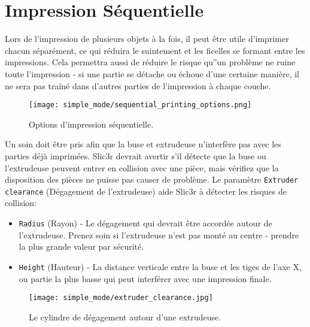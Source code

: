
\section{Impression S\'equentielle} %
\label{sec:sequential_printing}

Lors de l'impression de plusieurs objets \`a la fois, il peut \^etre utile d'imprimer chacun s\'epar\'ement, ce qui r\'eduira le suintement et les ficelles se formant entre les impressions. Cela permettra aussi de r\'eduire le risque qu''un probl\`eme ne ruine toute l'impression - si une partie se d\'etache ou \'echoue d'une certaine mani\`ere, il ne sera pas tra\^in\'e dans d'autres parties de l'impression \`a chaque couche.

\begin{figure}[H]
\centering
\texttt{[image: simple\_mode/sequential\_printing\_options.png]}
\caption{Options d'impression s\'equentielle.}
\label{fig:sequential_printing_options}
\end{figure}

Un soin doit \^etre pris afin que la buse et extrudeuse n'interf\`ere pas avec les parties d\'ej\`a imprim\'ees.  Slic3r devrait avertir s'il d\'etecte que la buse ou l'extrudeuse peuvent entrer en collision avec une pi\`ece, mais v\'erifiez que la disposition des pi\`eces ne puisse pas causer de probl\`eme.  Le param\`etre \texttt{Extruder clearance} (D\'egagement de l'extrudeuse) aide Slic3r \`a d\'etecter les risques de collision:
\begin{itemize}
	\item \texttt{Radius} (Rayon) - Le d\'egagement qui devrait \^etre accord\'ee autour de l'extrudeuse. Prenez soin si l'extrudeuse n'est pas mont\'e au centre - prendre la plus grande valeur par s\'ecurit\'e.
	\item \texttt{Height} (Hauteur) - La distance verticale entre la buse et les tiges de l'axe X, ou partie la plus basse qui peut interf\'erer avec une impression finale.
\end{itemize}

\begin{figure}[H]
\centering
\texttt{[image: simple\_mode/extruder\_clearance.jpg]}
\caption{Le cylindre de d\'egagement autour d'une extrudeuse.}
\label{fig:a_diagram_depicting_extruder_clearance}
\end{figure}

